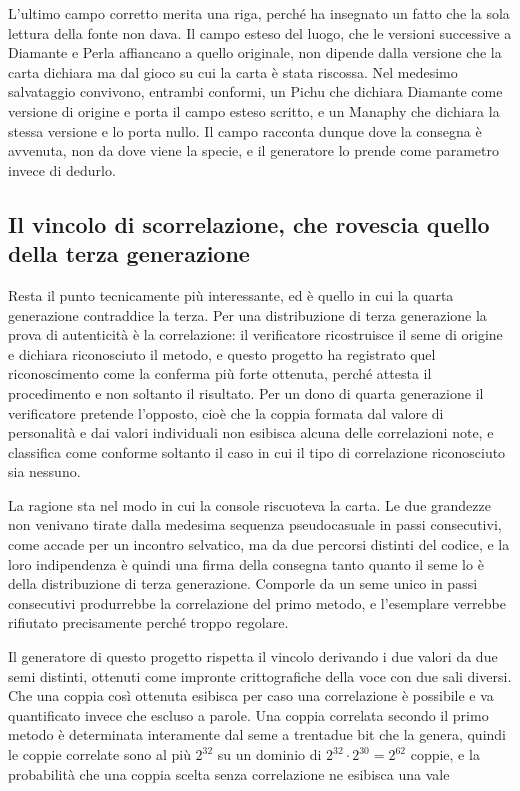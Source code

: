 L'ultimo campo corretto merita una riga, perché ha insegnato un fatto che la sola lettura della fonte non dava. Il campo esteso del luogo, che le versioni successive a Diamante e Perla affiancano a quello originale, non dipende dalla versione che la carta dichiara ma dal gioco su cui la carta è stata riscossa. Nel medesimo salvataggio convivono, entrambi conformi, un Pichu che dichiara Diamante come versione di origine e porta il campo esteso scritto, e un Manaphy che dichiara la stessa versione e lo porta nullo. Il campo racconta dunque dove la consegna è avvenuta, non da dove viene la specie, e il generatore lo prende come parametro invece di dedurlo.

\subsection{Il vincolo di scorrelazione, che rovescia quello della terza generazione}

Resta il punto tecnicamente più interessante, ed è quello in cui la quarta generazione contraddice la terza. Per una distribuzione di terza generazione la prova di autenticità è la correlazione: il verificatore ricostruisce il seme di origine e dichiara riconosciuto il metodo, e questo progetto ha registrato quel riconoscimento come la conferma più forte ottenuta, perché attesta il procedimento e non soltanto il risultato. Per un dono di quarta generazione il verificatore pretende l'opposto, cioè che la coppia formata dal valore di personalità e dai valori individuali non esibisca alcuna delle correlazioni note, e classifica come conforme soltanto il caso in cui il tipo di correlazione riconosciuto sia nessuno.

La ragione sta nel modo in cui la console riscuoteva la carta. Le due grandezze non venivano tirate dalla medesima sequenza pseudocasuale in passi consecutivi, come accade per un incontro selvatico, ma da due percorsi distinti del codice, e la loro indipendenza è quindi una firma della consegna tanto quanto il seme lo è della distribuzione di terza generazione. Comporle da un seme unico in passi consecutivi produrrebbe la correlazione del primo metodo, e l'esemplare verrebbe rifiutato precisamente perché troppo regolare.

Il generatore di questo progetto rispetta il vincolo derivando i due valori da due semi distinti, ottenuti come impronte crittografiche della voce con due sali diversi. Che una coppia così ottenuta esibisca per caso una correlazione è possibile e va quantificato invece che escluso a parole. Una coppia correlata secondo il primo metodo è determinata interamente dal seme a trentadue bit che la genera, quindi le coppie correlate sono al più $2^{32}$ su un dominio di $2^{32} \cdot 2^{30} = 2^{62}$ coppie, e la probabilità che una coppia scelta senza correlazione ne esibisca una vale

